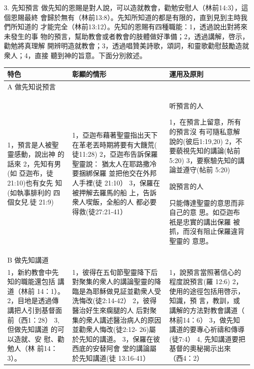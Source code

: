 3. 先知預言
做先知的恩賜是對人說，可以造就教會，勸勉安慰人（林前14:3），這個恩賜最終
會歸於無有（林前13:8）。先知所知道的都是有限的，直到見到主時我們所知道的
才能完全（林前13:12）。先知的恩賜有四種職能：1，透過說出對將來未發生的事
物的預言，幫助教會或者教會的肢體做好準備；2，透過講解，啓示，勸勉將真理解
開辨明造就教會；3，透過唱贊美詩歌，頌詞，和靈歌勸慰鼓勵造就衆人；4，直接
聽到神的旨意。下面分別敘述。
\begin{table}[H]
  \centering
    \begin{tabular}{p{15.145em}|p{15.785em}|p{16.5em}}    \toprule
    \multicolumn{1}{p{15.145em}|}{\textbf{特色}} & \multicolumn{1}{p{15.785em}|}{\textbf{彰顯的情形}} &  \multicolumn{1}{p{16.5em}}{\textbf{運用及原則}} \\    \midrule

 
A 做先知说预言& & \\    \midrule
1，預言是人被聖
靈感動，說出神
的話來
2，先知有男(如
亞迦布，徒
21:10)也有女先
知(如執事腓利的
四個女兒.徒
21:9)&

1，亞迦布藉著聖靈指出天下
在革老丟時期將要有大饑荒(
徒11:28)
2，亞迦布告訴保羅聖靈說：
猶太人在耶路撒冷要捆綁保羅
並把他交在外邦人手裡(徒
21:10）
3，保羅在被押解去羅馬的船
上，告訴衆人喫飯，全船的人
都必要得救(徒27:21-41）&
听預言的人

1，在預言上留意，所有的預言沒
有可隨私意解說的(彼后1:19,20)
2，不要藐視先知的講論(帖前
5:20)
3，要察驗先知的講論並遵守(帖前
5:20)

說預言的人

只能傳達聖靈的意思而非自己的意
思。如亞迦布衹是忠實的講出保羅
被抓，而沒有阻止保羅違背聖靈的
意思。\\  \midrule

B 做先知講道&&\\    \midrule
1，新約教會中先
知的職能還包括
講道（林前
14：1）。
2，目地是透過傳
講把人引到基督面前（西1：28）
3, 但做先知講道
的可以造就、安
慰、勸勉人（林
前14：3）。&

1，彼得在五旬節聖靈降下后
對聚集的衆人的講論聖靈的降
臨是為耶穌做見証並勸衆人受
洗悔改(徒2:14-42）
2，彼得醫治好生來瘸腿的人
后對聚集的衆人講述醫治病人的原因並勸衆人悔改(徒2:12-
26)屬於先知的講道。
3，保羅在彼西底的安替阿會
堂的講論屬於先知講道(徒
13:16-41）&

1，說預言當照著信心的程度說預言(羅
12:6)
2，使用的途徑包括用啓示，知識，預
言，教訓，或講解的方法對教會講道（
林前14：6）
3，做先知講道的要專心祈禱和傳導(徒7:4）
4, 先知講道要把基督的奧秘揭示出來
（西4：2）\\    \midrule


\end{tabular}
\end{table}
